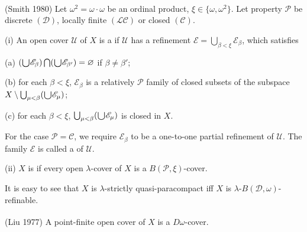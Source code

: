 \documentclass[ch3.tex]{subfiles}
\begin{document}
{  \label{def:3.2.3}
\textup{(\hstretch{1.8}{[}Smith 1980\hstretch{1.8}{]}\textsuperscript{\cite{Smith1980}})} 
Let $\omega^2 = \omega\cdot\omega$ be an ordinal product, $\xi\in\{\omega, \omega^2\}$. 
Let property $\mathcal{P}$ be discrete $(\mathcal{D})$, locally finite $(\mathcal{LC})$
or closed $(\mathcal{C})$.
	
\textup{(i)} An open cover $\mathscr{U}$ of $X$ is a 
if $\mathscr{U}$ has a refinement 
$\mathscr{E} = \bigcup_{\beta < \xi} \mathscr{E}_\beta$, which satisfies
	
\textup{(a)} $( \raisebox{-2pt}{\scalebox{1.5}{$\cup$}}\mathscr{E}_\beta) \bigcap ( \raisebox{-2pt}{\scalebox{1.5}{$\cup$}}\mathscr{E}_{\beta'}) = \varnothing$ 
if $\beta \ne \beta'$;

\textup{(b)} for each $\beta < \xi$, $\mathscr{E}_\beta$ is a relatively $\mathcal{P}$ family 
of closed subsets of the subspace 
$X\setminus \bigcup_{\mu<\beta}( \raisebox{-2pt}{\scalebox{1.5}{$\cup$}}\mathscr{E}_\mu)$;

\textup{(c)} for each $\beta < \xi$, $\bigcup_{\mu<\beta}
( \raisebox{-2pt}{\scalebox{1.5}{$\cup$}}\mathscr{E}_\mu)$ 
is closed in $X$.

\noindent For the case $\mathcal{P} = \mathcal{C}$, we require $\mathscr{E}_\beta$ to be a 
one-to-one partial refinement of $\mathscr{U}$.
The family $\mathscr{E}$ is called a 
of $\mathscr{U}$.

\textup{(ii)} $X$ is 
if every open $\lambda$-cover of $X$ is a $B(\mathcal{P}, \xi)$-cover.
}

\vspace{8pt}
It is easy to see that $X$ is $\lambda$-strictly quasi-paracompact iff $X$ is 
$\lambda$-$B(\mathcal{D}, \omega)$-refinable.

{\lemma{} \label{lem:3.2.4} 
\textup{(\hstretch{1.8}{[}Liu 1977\hstretch{1.8}{]}\textsuperscript{\cite{Liu}})} 
A point-finite open cover of $X$ is a $D\omega$-cover.
}
\end{document}
